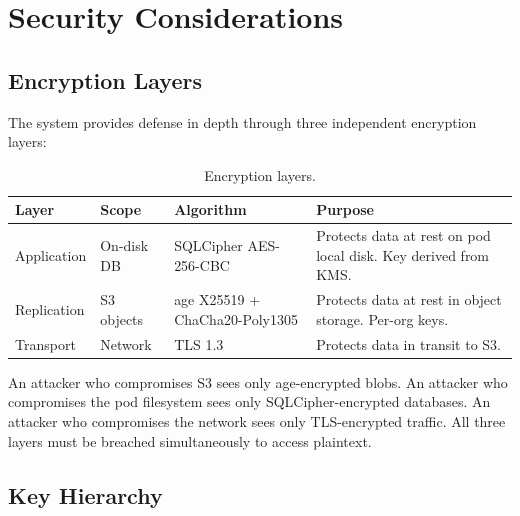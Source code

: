 \section{Security Considerations}
\label{sec:security}

\subsection{Encryption Layers}

The system provides defense in depth through three independent
encryption layers:

\begin{table}[H]
\centering
\caption{Encryption layers.}
\label{tab:encryption}
\begin{tabular}{@{}lllp{5cm}@{}}
\toprule
\textbf{Layer} & \textbf{Scope} & \textbf{Algorithm} & \textbf{Purpose} \\
\midrule
Application & On-disk DB & SQLCipher AES-256-CBC & Protects data at rest
  on pod local disk. Key derived from KMS. \\
Replication & S3 objects & age X25519 + ChaCha20-Poly1305 & Protects
  data at rest in object storage. Per-org keys. \\
Transport & Network & TLS 1.3 & Protects data in transit to S3. \\
\bottomrule
\end{tabular}
\end{table}

An attacker who compromises S3 sees only age-encrypted blobs. An
attacker who compromises the pod filesystem sees only
SQLCipher-encrypted databases. An attacker who compromises the network
sees only TLS-encrypted traffic. All three layers must be breached
simultaneously to access plaintext.

\subsection{Key Hierarchy}\label{sec:key-hierarchy}

